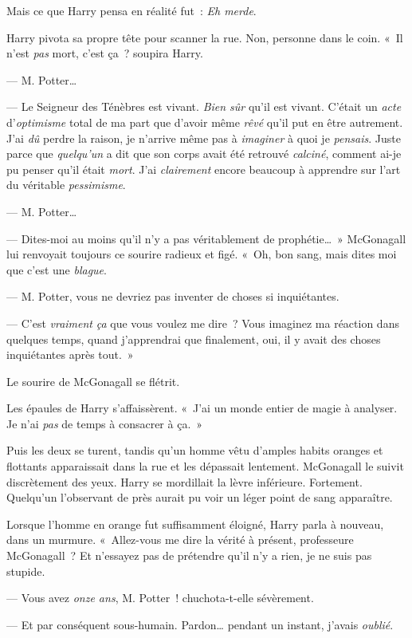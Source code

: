 Mais ce que Harry pensa en réalité fut~: \emph{Eh merde}.

Harry pivota sa propre tête pour scanner la rue. Non, personne dans le coin.  «~Il n'est \emph{pas} mort, c'est ça~? soupira Harry.

--- M. Potter…

--- Le Seigneur des Ténèbres est vivant. \emph{Bien sûr} qu'il est vivant.
C'était un \emph{acte} d'\emph{optimisme} total de ma part que d'avoir même \emph{rêvé} qu'il put en être autrement.
J'ai \emph{dû} perdre la raison, je n'arrive même pas à \emph{imaginer} à quoi je \emph{pensais}.
Juste parce que \emph{quelqu'un} a dit que son corps avait été retrouvé \emph{calciné}, comment ai-je pu penser qu'il était \emph{mort}.
J'ai \emph{clairement} encore beaucoup à apprendre sur l'art du véritable \emph{pessimisme}.

--- M. Potter…

--- Dites-moi au moins qu'il n'y a pas véritablement de prophétie…~» McGonagall lui renvoyait toujours ce sourire radieux et figé. «~Oh, bon sang, mais dites moi que c'est une \emph{blague}.

--- M. Potter, vous ne devriez pas inventer de choses si inquiétantes.

--- C'est \emph{vraiment} \emph{ça} que vous voulez me dire~?
Vous imaginez ma réaction dans quelques temps, quand j'apprendrai que finalement, oui, il y avait des choses inquiétantes après tout.~»

Le sourire de McGonagall se flétrit.

Les épaules de Harry s'affaissèrent. «~J'ai un monde entier de magie à analyser. Je n'ai \emph{pas} de temps à consacrer à ça.~»

Puis les deux se turent, tandis qu'un homme vêtu d'amples habits oranges et flottants apparaissait dans la rue et les dépassait lentement.
McGonagall le suivit discrètement des yeux.
Harry se mordillait la lèvre inférieure. Fortement.
Quelqu'un l'observant de près aurait pu voir un léger point de sang apparaître.

Lorsque l'homme en orange fut suffisamment éloigné, Harry parla à nouveau, dans un murmure.
«~Allez-vous me dire la vérité à présent, professeure McGonagall~? Et n'essayez pas de prétendre qu'il n'y a rien, je ne suis pas stupide.

--- Vous avez \emph{onze ans}, M. Potter~! chuchota-t-elle sévèrement.

--- Et par conséquent sous-humain. Pardon… pendant un instant, j'avais \emph{oublié}.

